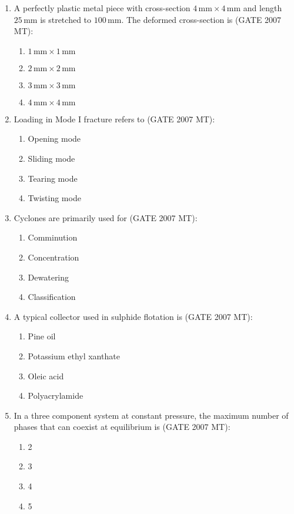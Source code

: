 \documentclass[12pt]{article}
\begin{document}
\begin{enumerate}
\item A perfectly plastic metal piece with cross-section $4\,\mathrm{mm} \times 4\,\mathrm{mm}$ and length $25\,\mathrm{mm}$ is stretched to $100\,\mathrm{mm}$. The deformed cross-section is (GATE 2007 MT):
    \begin{enumerate}
        \item $1\,\mathrm{mm} \times 1\,\mathrm{mm}$
        \item $2\,\mathrm{mm} \times 2\,\mathrm{mm}$
        \item $3\,\mathrm{mm} \times 3\,\mathrm{mm}$
        \item $4\,\mathrm{mm} \times 4\,\mathrm{mm}$
    \end{enumerate}

\item Loading in Mode I fracture refers to (GATE 2007 MT):
    \begin{enumerate}
        \item Opening mode
        \item Sliding mode
        \item Tearing mode
        \item Twisting mode
    \end{enumerate}

\item Cyclones are primarily used for (GATE 2007 MT):
    \begin{enumerate}
        \item Comminution
        \item Concentration
        \item Dewatering
        \item Classification
    \end{enumerate}

\item A typical collector used in sulphide flotation is (GATE 2007 MT):
    \begin{enumerate}
        \item Pine oil
        \item Potassium ethyl xanthate
        \item Oleic acid
        \item Polyacrylamide
    \end{enumerate}

\item In a three component system at constant pressure, the maximum number of phases that can coexist at equilibrium is (GATE 2007 MT):
    \begin{enumerate}
        \item 2
        \item 3
        \item 4
        \item 5
    \end{enumerate}


\end{enumerate}
\end{document}
